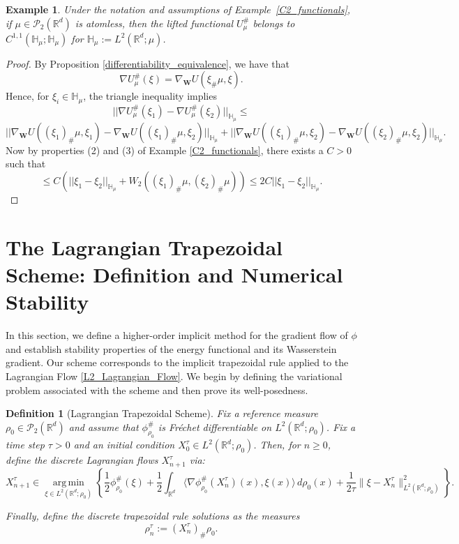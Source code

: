 \documentclass[11pt,a4paper]{amsart}
\newcommand{\1}{\mathds{1}}
\newcommand{\R}{{\mathbb R}}
\newtheorem{example}[theorem]{\textbf{Example}}
\newtheorem{definition}[theorem]{\textbf{Definition}}
\numberwithin{equation}{section}
\begin{document}
\begin{example} \label{C11_Lifted_Functional}
Under the notation and assumptions of Example~\ref{C2_functionals}, if $\mu \in \mathcal{P}_2(\mathbb{R}^d)$ is atomless, then the lifted functional $U^{\#}_{\mu}$ belongs to $C^{1,1}(\mathbb{H}_{\mu}; \mathbb{H}_{\mu})$ for $\mathbb{H}_{\mu} := L^2(\R^d;\mu)$.
\end{example}


\begin{proof} By Proposition \ref{differentiability_equivalence}, we have that
\[ \nabla U^{\#}_{\mu}(\xi) = \nabla_{\mathbf{W}} U(\xi_{\#} \mu,\xi). \] Hence, for $\xi_i \in \mathbb{H}_{\mu}$, the triangle inequality implies
    \[ ||\nabla U^{\#}_{\mu}(\xi_1) - \nabla U^{\#}_{\mu}(\xi_2)||_{\mathbb{H}_{\mu}} \leq \] \[ || \nabla_{\mathbf{W}} U( (\xi_1)_{\#} \mu,\xi_1) - \nabla_{\mathbf{W}} U( (\xi_1)_{\#} \mu,\xi_2)||_{\mathbb{H}_{\mu}} +  || \nabla_{\mathbf{W}} U( (\xi_1)_{\#} \mu,\xi_2) - \nabla_{\mathbf{W}} U( (\xi_2)_{\#} \mu,\xi_2) ||_{\mathbb{H}_{\mu}}. \] Now by properties (2) and (3) of Example \ref{C2_functionals}, there exists a $C>0$ such that
\[ \leq C (||\xi_1-\xi_2||_{\mathbb{H}_{\mu}} + W_2( (\xi_1)_{\#} \mu, (\xi_2)_{\#} \mu)) \leq 2C ||\xi_1-\xi_2||_{\mathbb{H}_{\mu}}. \]
\end{proof}


\section{The Lagrangian Trapezoidal Scheme: Definition and Numerical Stability} \label{stability_section}

In this section, we define a higher-order implicit method for the gradient flow of $\phi$ and establish stability properties of the energy functional and its Wasserstein gradient. Our scheme corresponds to the implicit trapezoidal rule applied to the Lagrangian Flow \eqref{L2_Lagrangian_Flow}. We begin by defining the variational problem associated with the scheme and then prove its well-posedness.

\begin{definition}[Lagrangian Trapezoidal 
Scheme] \label{trapezoid_def} Fix a reference measure $\rho_0 \in \mathcal{P}_{2}(\mathbb{R}^d)$ and assume that $\phi^{\#}_{\rho_0}$ is Fr\'echet differentiable on $L^2(\R^d;\rho_0)$. Fix a time step $\tau > 0$ and an initial condition $X_0^{\tau} \in L^2(\mathbb{R}^d; \rho_0)$. Then, for $n \geq 0$, define the discrete Lagrangian flows $X_{n+1}^\tau$ via:
\begin{equation}
X_{n+1}^\tau \in \operatorname*{arg\,min}_{\xi \in L^2(\mathbb{R}^d; \rho_0)}
\left\{
\frac{1}{2} \phi^{\#}_{\rho_0}(\xi)
+ \frac{1}{2} \int_{\mathbb{R}^d} \langle \nabla \phi^{\#}_{\rho_0}(X^{\tau}_n)(x), \xi(x) \rangle \, d\rho_0(x)
+ \frac{1}{2\tau} \|\xi - X_n^\tau\|_{L^2(\mathbb{R}^d; \rho_0)}^2 
\right\}.
\label{trapezoid_var_problem}
\end{equation}

\noindent Finally, define the discrete trapezoidal rule solutions as the measures
\[
\rho_n^\tau := (X_n^\tau)_{\#} \rho_0.
\]
\end{definition}
\end{document}
